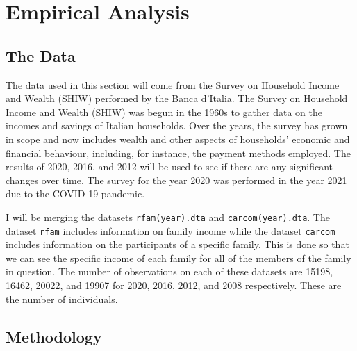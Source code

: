 \documentclass[12pt]{article}
\begin{document}
\section{Empirical Analysis}

\subsection{The Data}

\begin{spacing}{1.5}

The data used in this section will come from the Survey on Household Income and Wealth (SHIW) performed by the Banca d'Italia.  The Survey on Household Income and Wealth (SHIW) was begun in the 1960s to gather data on the incomes and savings of Italian households. Over the years, the survey has grown in scope and now includes wealth and other aspects of households' economic and financial behaviour, including, for instance, the payment methods employed. The results of 2020, 2016, and 2012 will be used to see if there are any significant changes over time. The survey for the year 2020 was performed in the year 2021 due to the COVID-19 pandemic. 


I will be merging the datasets \verb+rfam(year).dta+ and \verb+carcom(year).dta+. The dataset \verb+rfam+ includes information on family income while the dataset \verb+carcom+ includes information on the participants of a specific family. This is done so that we can see the specific income of each family for all of the members of the family in question. The number of observations on each of these datasets are 15198, 16462, 20022, and 19907 for 2020, 2016, 2012, and 2008 respectively. These are the number of individuals.

\end{spacing}

\subsection{Methodology}
\end{document}
